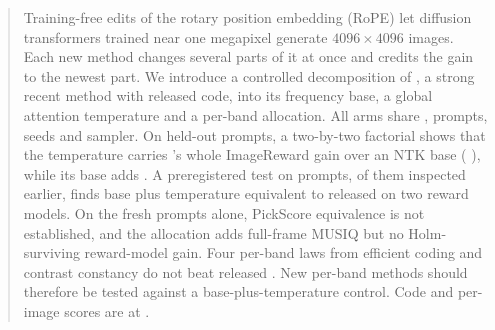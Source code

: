 \begin{abstract}
Training-free edits of the rotary position embedding (RoPE) let diffusion transformers trained near one megapixel generate $4096\times4096$ images. Each new method changes several parts of it at once and credits the gain to the newest part. We introduce a controlled decomposition of \sega, a strong recent method with released code, into its frequency base, a global attention temperature and a per-band allocation. All arms share \krea, prompts, seeds and sampler. On  held-out prompts, a two-by-two factorial shows that the temperature carries \sega's whole ImageReward gain over an NTK base ( ), while its base adds  . A preregistered test on  prompts,  of them inspected earlier, finds base plus temperature equivalent to released \sega{} on two reward models. On the  fresh prompts alone, PickScore equivalence is not established, and the allocation adds   full-frame MUSIQ but no Holm-surviving reward-model gain. Four per-band laws from efficient coding and contrast constancy do not beat released \sega. New per-band methods should therefore be tested against a base-plus-temperature control. Code and per-image scores are at \codeurl.
\end{abstract}
